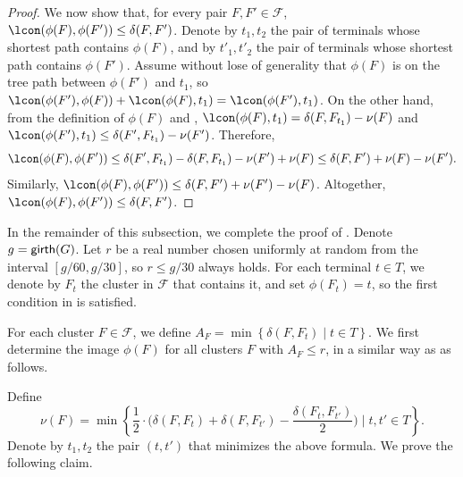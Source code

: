\documentclass[11pt]{article}
\theoremstyle{definition}
\newcommand{\set}[1]{\left\{ #1 \right\}}
\newcommand{\fset}{{\mathcal{F}}}
\newcommand{\gir}{\textnormal{\textsf{girth}}}
\newcounter{note}
\newcommand{\znote}[1]{\refstepcounter{note}$\ll${\bf ZT~\thenote:}
	{\sf \color{red} #1}$\gg$\marginpar{\tiny\bf ZT~\thenote}}
\begin{document}
\begin{titlepage}
\begin{proof}
We now show that, for every pair $F,F'\in \fset$, $\lcon(\phi(F),\phi(F')) \le \delta(F,F')$. 
Denote by $t_1,t_2$ the pair of terminals whose shortest path contains $\phi(F)$, and by $t'_1,t'_2$ the pair of terminals whose shortest path contains $\phi(F')$.
Assume without lose of generality that $\phi(F)$ is on the tree path between $\phi(F')$ and $t_1$, so $\lcon(\phi(F'),\phi(F)) + \lcon(\phi(F),{t_1}) = \lcon(\phi(F'),{t_1})$. On the other hand, from the definition of $\phi(F)$ and , $\lcon(\phi(F),{t_1}) = \delta(F,F_{t_1}) - \nu(F)$ and $\lcon(\phi(F'),{t_1}) \le \delta(F',F_{t_1}) - \nu(F')$. Therefore, 
$$\lcon(\phi(F),\phi(F')) \le \delta(F',F_{t_1}) - \delta(F,F_{t_1}) - \nu(F') + \nu(F) \le \delta(F,F') + \nu(F) - \nu(F').$$ Similarly, $\lcon(\phi(F),\phi(F')) \le \delta(F,F') + \nu(F') - \nu(F)$. Altogether, $\lcon(\phi(F),\phi(F')) \le \delta(F,F')$.
\end{proof}


In the remainder of this subsection, we complete the proof of .
Denote $g=\gir(G)$. 
Let $r$ be a real number chosen uniformly at random from the interval $[g/60,g/30]$, so $r\le g/30$ always holds.
For each terminal $t\in T$, we denote by $F_t$ the cluster in $\fset$ that contains it, and set $\phi(F_t)=t$, so the first condition in  is satisfied.


For each cluster $F\in \fset$, we define $A_F=\min\set{\delta(F,F_t)\mid t\in T}$.
We first determine the image $\phi(F)$ for all clusters $F$ with $A_F \le r$, in a similar way as  as follows.

Define \[\nu(F)=\min\set{\frac{1}{2}\cdot \bigg(\delta(F,F_t)+\delta(F,F_{t'})-\frac{\delta(F_t,F_{t'})}{2}\bigg)\mid t,t'\in T}.\]
Denote by $t_1,t_2$ the pair $(t,t')$ that minimizes the above formula. We prove the following claim.


\end{titlepage}
\end{document}
